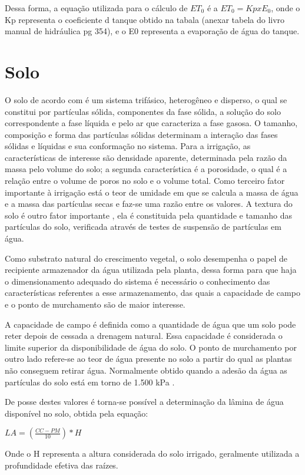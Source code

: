 Dessa forma, a equação utilizada para o cálculo de $ET_{0}$ é a $ET_{0}=Kp x E_{0}$, onde o Kp representa o coeficiente d tanque obtido na tabala (anexar tabela do livro manual de hidráulica pg 354), e o E0 representa a evaporação de água do tanque.


\section{Solo}

O solo de acordo com 
 é um sistema trifásico, heterogêneo e disperso, o qual se constitui por partículas sólida, componentes da fase sólida, a solução do solo correspondente a fase líquida e pelo ar que caracteriza a fase gasosa. O tamanho, composição e forma das partículas sólidas determinam a interação das fases sólidas e líquidas e sua conformação no sistema. Para a irrigação, as características de interesse são densidade aparente, determinada pela razão da massa pelo volume do solo; a segunda característica é a porosidade, o qual é a relação entre o volume de poros no solo e o volume total. Como terceiro fator importante à irrigação está o teor de umidade em que se calcula a massa de água e a massa das partículas secas e faz-se uma razão entre os valores. A textura do solo é outro fator importante , ela é constituida pela quantidade e tamanho das partículas do solo, verificada através de testes de suspensão de partículas em água.  
 
Como substrato natural do crescimento vegetal, o solo desempenha o papel de recipiente armazenador da água utilizada pela planta, dessa forma para que haja o dimensionamento adequado do sistema é necessário o conhecimento das características referentes a esse armazenamento, das quais a capacidade de campo e o ponto de murchamento são de maior interesse.

A capacidade de campo é definida como a quantidade de água que um solo pode reter depois de cessada a drenagem natural. Essa capacidade é considerada o limite superior da disponibilidade de água do solo. O ponto de murchamento por outro lado refere-se ao teor de água presente no solo a partir do qual as plantas não conseguem retirar água. Normalmente obtido quando a adesão da água as partículas do solo está em torno de 1.500 kPa \cite{azevedonetto2015}.

De posse destes valores é torna-se possível a determinação da lâmina de água disponível no solo, obtida pela equação: 
\begin{center}

\begin{math}
LA=(\frac{CC-PM}{10})*H
\end{math}

\end{center}
Onde o H representa a altura considerada do solo irrigado, geralmente utilizada a profundidade efetiva das raízes.

